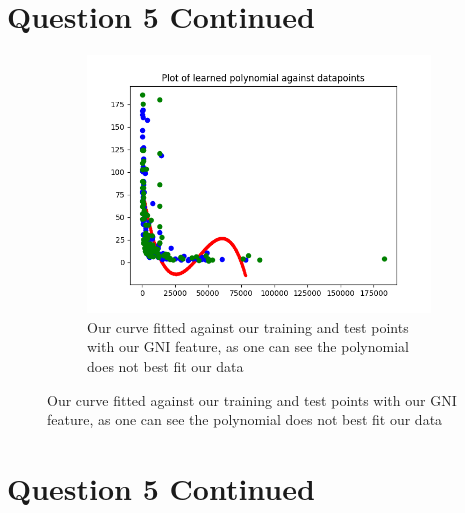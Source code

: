 \documentclass{article}
\begin{document}
\pagebreak

\section{Question 5 Continued}\label{sec:Question5Continued}

\begin{enumerate}
	\begin{figure}[h!]
		\centering
		\begin{subfigure}[b]{0.4\linewidth}
			\includegraphics[width=\linewidth]{GNICurve.png}
			\caption{Our curve fitted against our training and test points with our GNI feature, as one can see the polynomial does not best fit our data}
		\end{subfigure}
		
	\end{figure}
\end{enumerate}


\pagebreak

\section{Question 5 Continued}\label{sec:Question5Continued}
\end{document}
